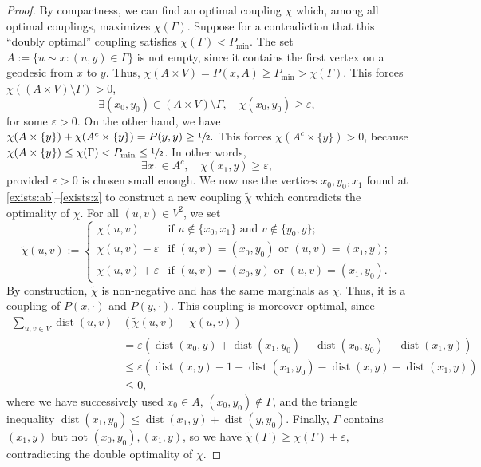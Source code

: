 \documentclass[JEP,XML,SOM,Unicode,NoEqCountersInSection,published]{cedram}
\theoremstyle{definition}
\newcommand{\pmin}{P_{\mathrm{min}}}
\DeclareMathOperator{\dist}{dist}
\begin{document}
\begin{proof}
By compactness, we can find an optimal coupling $\chi$ which, among all optimal couplings, maximizes $\chi(\Gamma)$. Suppose for a contradiction that this ``doubly optimal'' coupling satisfies $\chi\left(\Gamma\right)< \pmin$. The set ${A}:=\{u\sim x\colon (u,y)\in \Gamma\}$ is not empty, since it contains the first vertex on a geodesic from $x$ to $y$. Thus,
$\chi(A\times V) = P(x,A) \ge \pmin>\chi(\Gamma)$.
This forces $\chi((A\times V)\setminus\Gamma)>0$, \ie
\begin{equation}
\label{exists:ab}\exists (x_0,y_0)\in (A\times V)\setminus\Gamma,\quad \chi(x_0,y_0) \ge \varepsilon,
\end{equation}
for some $\varepsilon>0$. On the other hand, we have
$
\chi(A\times\{y\}) + \chi(A^c\times\{y\}) = P(y,y)\ge\sfrac{1}{2}.
$
This forces $\chi(A^c\times\{y\}) > 0$, because $\chi(A\times\{y\})\le \chi(\Gamma)<\pmin\le \sfrac{1}{2}$. In other words,
\begin{equation}
\label{exists:z}
\exists x_1\in A^c,\quad \chi(x_1,y) \ge \varepsilon,
\end{equation}
provided $\varepsilon>0$ is chosen small enough. We now use the vertices $x_0,y_0,x_1$ found at \eqref{exists:ab}--\eqref{exists:z} to construct a new coupling $\widetilde{\chi}$ which contradicts the optimality of $\chi$. For all $(u,v)\in V^2$, we set
\begin{equation*}
\widetilde{\chi}(u,v) := 
\begin{cases}
\chi(u,v) & \textrm{if }u\notin\{x_0,x_1\}\textrm{ and }v\notin\{y_0,y\};\\
\chi(u,v)-\varepsilon &\textrm{if }(u,v)=(x_0,y_0)\textrm{ or }(u,v)=(x_1,y);\\
\chi(u,v)+\varepsilon & \textrm{if }(u,v)=(x_0,y)\textrm{ or }(u,v)=(x_1,y_0).
\end{cases}
\end{equation*}
By construction, $\widetilde{\chi}$ is non-negative and has the same marginals as $\chi$. Thus, it is a coupling of $P(x,\cdot)$ and $P(y,\cdot)$. This coupling is moreover optimal, since
\begin{align*}
 \sum_{u,v\in V}\dist(u,v)&\left(\widetilde{\chi}(u,v)-\chi(u,v)\right) \\[-8pt] & = \varepsilon\left(\dist(x_0,y)+\dist(x_1,y_0)-\dist(x_0,y_0)-\dist(x_1,y)\right)\\
& \le \varepsilon\left(\dist(x,y)-1+\dist(x_1,y_0)-\dist(x,y)-\dist(x_1,y)\right)\\
& \le 0,
\end{align*}
where we have successively used $x_0\in A$, $(x_0,y_0)\notin\Gamma$, and the triangle inequality $\dist(x_1,y_0)\le \dist(x_1,y)+\dist(y,y_0)$. Finally, $\Gamma$ contains $(x_1,y)$ but not $(x_0,y_0),(x_1,y)$, so we have
$
\widetilde{\chi}(\Gamma) \ge \chi(\Gamma)+\varepsilon,
$
contradicting the double optimality of $\chi$.
\end{proof}
\end{document}
